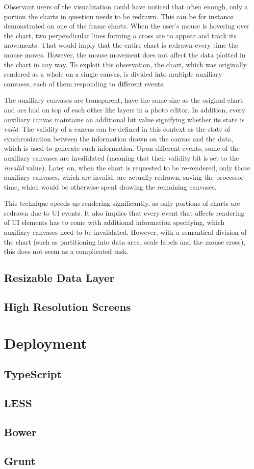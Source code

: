Observant users of the visualization could have noticed that often enough, only a portion the charts in question needs to be redrawn. This can be for instance demonstrated on one of the frame charts. When the user's mouse is hovering over the chart, two perpendicular lines forming a cross are to appear and track its movements. That would imply that the entire chart is redrawn every time the mouse moves. However, the mouse movement does not affect the data plotted in the chart in any way. To exploit this observation, the chart, which was originally rendered as a whole on a single canvas, is divided into multiple auxiliary canvases, each of them responding to different events.

The auxiliary canvases are transparent, have the same size as the original chart and are laid on top of each other like layers in a photo editor. In addition, every auxiliary canvas maintains an additional bit value signifying whether its state is \textit{valid}. The validity of a canvas can be defined in this context as the state of synchronization between the information drawn on the canvas and the data, which is used to generate such information. Upon different events, some of the auxiliary canvases are invalidated (meaning that their validity bit is set to the \textit{invalid} value). Later on, when the chart is requested to be re-rendered, only those auxiliary canvases, which are invalid, are actually redrawn, saving the processor time, which would be otherwise spent drawing the remaining canvases.

This technique speeds up rendering significantly, as only portions of charts are redrawn due to UI events. It also implies that every event that affects rendering of UI elements has to come with additional information specifying, which auxiliary canvases need to be invalidated. However, with a semantical division of the chart (such as partitioning into data area, scale labels and the mouse cross), this does not seem as a complicated task.

\subsection{Resizable Data Layer}

\subsection{High Resolution Screens}

\section{Deployment}

\subsection{TypeScript}

\subsection{LESS}

\subsection{Bower}

\subsection{Grunt}
